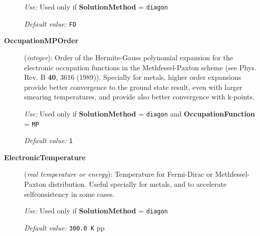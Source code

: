 \documentclass[11pt]{article}
\begin{document}
\begin{description}
{\it Use:} Used only if {\bf SolutionMethod} = {\tt diagon}

{\it Default value:} {\tt FD} 

\item[{\bf OccupationMPOrder}]({\it integer}):
Order of the Hermite-Gauss polynomial expansion for the
electronic occupation functions in the Methfessel-Paxton
scheme (see Phys. Rev. B  {\bf 40}, 3616 (1989)).
Specially for metals, higher order expansions provide better convergence
to the ground state result, even with larger smearing
temperatures, and provide also better convergence with k-points.


{\it Use:} Used only if {\bf SolutionMethod} = {\tt diagon}
and {\bf OccupationFunction} =  {\tt MP}

{\it Default value:} {\tt 1} 



\item[{\bf ElectronicTemperature}] ({\it real temperature or energy}): 
Temperature for Fermi-Dirac or Methfessel-Paxton
distribution. Useful specially for
metals, and to accelerate selfconsistency in some cases.

{\it Use:} Used only if {\bf SolutionMethod} = {\tt diagon}

{\it Default value:} {\tt 300.0 K}
pp

\end{description}
\end{document}
